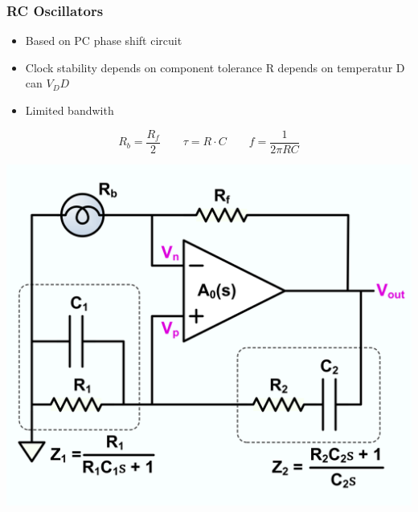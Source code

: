 \subsubsection{RC Oscillators}
\begin{minipage}{0.5\linewidth}
\begin{itemize}
    \item Based on PC phase shift circuit
    \item Clock stability depends on component tolerance
        \subitem R depends on temperatur
        \subitem D can $ V_DD $
    \item Limited bandwith   
\end{itemize}
\[ R_b = \dfrac{R_f}{2} \qquad \tau=R\cdot C \qquad f = \dfrac{1}{2 \pi RC}  \]
\end{minipage}
\begin{minipage}{0.5\linewidth}
    \hspace{1cm}\includegraphics[width=0.6\linewidth]{images/RCOscillator} 
\end{minipage}

